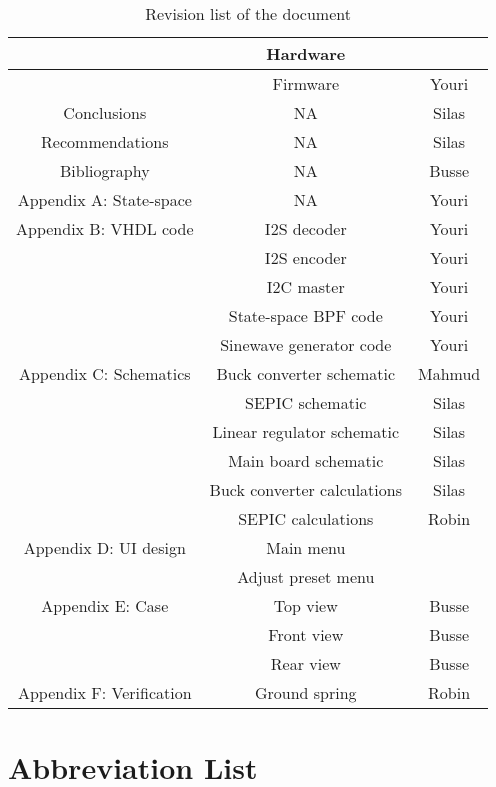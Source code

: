 \begin{justify}
\begin{table}[!h]
\begin{tabular}{|c|c|c|}
							& Hardware						& 					\\ \hline
							& Firmware						& Youri				\\ \hline
Conclusions					& NA							& Silas				\\ \hline
Recommendations				& NA							& Silas				\\ \hline
Bibliography				& NA							& Busse				\\ \hline
Appendix A: State-space		& NA							& Youri				\\ \hline
Appendix B: VHDL code		& I2S decoder					& Youri				\\ \hline
							& I2S encoder					& Youri				\\ \hline
							& I2C master					& Youri				\\ \hline
							& State-space BPF code			& Youri				\\ \hline
							& Sinewave generator code		& Youri				\\ \hline
Appendix C: Schematics		& Buck converter schematic		& Mahmud			\\ \hline
							& SEPIC schematic				& Silas				\\ \hline
							& Linear regulator schematic	& Silas				\\ \hline
							& Main board schematic			& Silas				\\ \hline
							& Buck converter calculations	& Silas				\\ \hline
							& SEPIC calculations			& Robin				\\ \hline
Appendix D: UI design		& Main menu						& 					\\ \hline
							& Adjust preset menu			& 					\\ \hline
Appendix E: Case			& Top view						& Busse				\\ \hline
							& Front view					& Busse				\\ \hline
							& Rear view						& Busse				\\ \hline
Appendix F: Verification	& Ground spring					& Robin				\\ \hline

\end{tabular}
\caption{Revision list of the document}
\label{Revision history}
\end{table}

\newpage
\pagestyle{plain}
\setcounter{page}{1}

\chapter*{Abbreviation List}


\end{justify}
